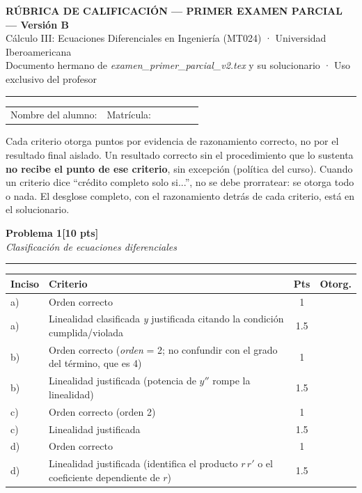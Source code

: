 \documentclass[11pt,letterpaper]{article}
\makeatletter
\newcommand{\problema}[3]{%
  \bigskip\bigskip\noindent
  {\Large\textbf{Problema #1}}\hfill\textbf{[#2 pts]}\\[3pt]
  {\small\itshape #3}\par
  \vspace{2pt}\hrule\vspace{8pt}
}
\newenvironment{tablarubrica}{%
  \begin{tabular}{@{}p{1.1cm}Lcc@{}}
  \toprule
  \textbf{Inciso} & \textbf{Criterio} & \textbf{Pts} & \textbf{Otorg.} \\
  \midrule
}{%
  \bottomrule
  \end{tabular}
}
\makeatother
\begin{document}
\begin{center}
{\Large\bfseries RÚBRICA DE CALIFICACIÓN — PRIMER EXAMEN PARCIAL --- Versión B}\\[2pt]
{\small Cálculo III: Ecuaciones Diferenciales en Ingeniería (MT024) · Universidad Iberoamericana}\\[1pt]
{\small Documento hermano de \textit{examen\_primer\_parcial\_v2.tex} y su solucionario · Uso exclusivo del profesor}
\end{center}

\vspace{4pt}\hrule\vspace{10pt}

\noindent
\begin{tabular}{@{}p{0.5\linewidth}p{0.5\linewidth}@{}}
Nombre del alumno: \dotfill & Matrícula: \dotfill \\[10pt]
\end{tabular}

\vspace{10pt}

 Cada criterio otorga puntos por evidencia de razonamiento correcto, no por el resultado final aislado. Un resultado correcto sin el procedimiento que lo sustenta \textbf{no recibe el punto de ese criterio}, sin excepción (política del curso). Cuando un criterio dice ``crédito completo solo si...'', no se debe prorratear: se otorga todo o nada. El desglose completo, con el razonamiento detrás de cada criterio, está en el solucionario.

\problema{1}{10}{Clasificación de ecuaciones diferenciales}

\begin{tablarubrica}
a) & Orden correcto & 1 & \\
a) & Linealidad clasificada \emph{y} justificada citando la condición cumplida/violada & 1.5 & \\
b) & Orden correcto (\emph{orden} = 2; no confundir con el grado del término, que es 4) & 1 & \\
b) & Linealidad justificada (potencia de $y''$ rompe la linealidad) & 1.5 & \\
c) & Orden correcto (orden 2) & 1 & \\
c) & Linealidad justificada & 1.5 & \\
d) & Orden correcto & 1 & \\
d) & Linealidad justificada (identifica el producto $r\,r'$ o el coeficiente dependiente de $r$) & 1.5 & \\
\end{tablarubrica}
\end{document}
